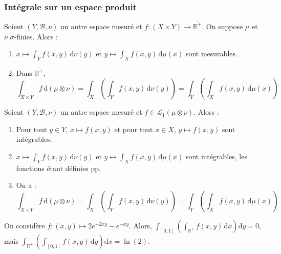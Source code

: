   \subsubsection{Intégrale sur un espace produit}


  \begin{theorem}
    Soient $(Y, \mathcal{B}, \nu)$ un autre espace mesuré et $f : (X \times Y) \rightarrow \overline{\mathbb{R}^+}$. On suppose $\mu$ et $\nu$ $\sigma$-finies. Alors :
    \begin{enumerate}[label=(\roman*)]
      \item $x \mapsto \int_Y f(x,y) \, \mathrm{d}\nu(y)$ et $y \mapsto \int_X f(x,y) \, \mathrm{d}\mu(x)$ sont mesurables.
      \item Dans $\overline{\mathbb{R}^+}$,
      \[ \int_{X \times Y} f \, \mathrm{d}(\mu \otimes \nu) = \int_X \left( \int_Y f(x,y) \, \mathrm{d}\nu(y) \right) = \int_Y \left( \int_X f(x,y) \, \mathrm{d}\mu(x) \right) \]
    \end{enumerate}
  \end{theorem}

  \begin{theorem}
    Soient $(Y, \mathcal{B}, \nu)$ un autre espace mesuré et $f \in \mathcal{L}_1 (\mu \otimes \nu)$. Alors :
    \begin{enumerate}[label=(\roman*)]
      \item Pour tout $y \in Y$, $x \mapsto f(x,y)$ et pour tout $x \in X$, $y \mapsto f(x,y)$ sont intégrables.
      \item $x \mapsto \int_Y f(x,y) \, \mathrm{d}\nu(y)$ et $y \mapsto \int_X f(x,y) \, \mathrm{d}\mu(x)$ sont intégrables, les fonctions étant définies pp.
      \item On a :
      \[ \int_{X \times Y} f \, \mathrm{d}(\mu \otimes \nu) = \int_X \left( \int_Y f(x,y) \, \mathrm{d}\nu(y) \right) = \int_Y \left( \int_X f(x,y) \, \mathrm{d}\mu(x) \right) \]
    \end{enumerate}
  \end{theorem}

  \begin{cexample}
    On considère $f : (x,y) \mapsto 2e^{-2xy} - e^{-xy}$. Alors, $\int_{[0,1]} \left( \int_{\mathbb{R}^+} f(x,y) \, \mathrm{d}x \right) \mathrm{d}y = 0$, mais $\int_{\mathbb{R}^+} \left( \int_{[0,1]} f(x,y) \, \mathrm{d}y \right) \mathrm{d}x = \ln(2)$.
  \end{cexample}

